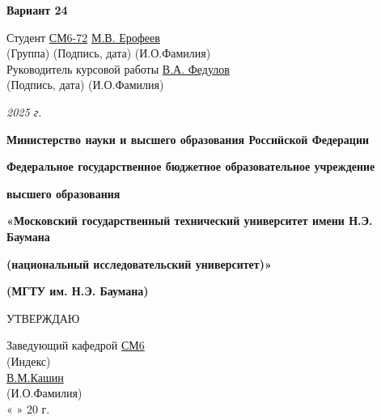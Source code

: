 \documentclass[14pt, a4paper]{extarticle} %
\newcommand{\und}[1]{\uline{#1}}
\begin{document}
\begin{titlepage}
    \vspace{1.5cm}
    \textbf{Вариант 24}

    \vspace{2cm}
    \begin{flushleft}
        Студент \und{СМ6-72} \hfill \underline{\hspace{5cm}} \hfill \und{М.В. Ерофеев} \\
        \hspace{4.8cm} (Группа) \hspace{2.3cm} (Подпись, дата) \hspace{1.8cm} (И.О.Фамилия) \\[1cm]
        Руководитель курсовой работы \hfill \underline{\hspace{5cm}} \hfill \und{В.А. Федулов} \\
        \hspace{7.5cm} (Подпись, дата) \hspace{1.8cm} (И.О.Фамилия)
    \end{flushleft}

    \vfill
    \centering
    \textit{2025 г.}

    \newpage %

    \centering
    \textbf{Министерство науки и высшего образования Российской Федерации}

    \textbf{Федеральное государственное бюджетное образовательное учреждение}

    \textbf{высшего образования}

    \textbf{«Московский государственный технический университет имени Н.Э. Баумана}

    \textbf{(национальный исследовательский университет)»}

    \textbf{(МГТУ им. Н.Э. Баумана)}

    \vspace{1cm}
    УТВЕРЖДАЮ

    \vspace{0.5cm}
    Заведующий кафедрой \und{СМ6} \\
    \hspace{1.5cm} (Индекс) \\[0.5cm]
    \underline{\hspace{5cm}} \und{В.М.Кашин} \\
    \hspace{0.5cm} (И.О.Фамилия) \\[0.5cm]
    « \underline{\hspace{1cm}} » \underline{\hspace{3cm}} 20 \underline{\hspace{1cm}} г.


\end{titlepage}
\end{document}

